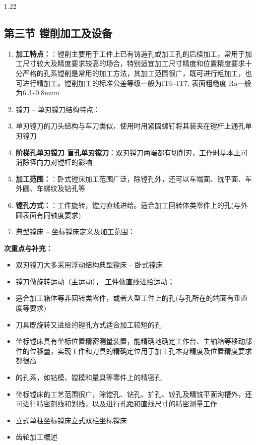 \documentclass[12pt,a4paper]{article}
\begin{document}
\begin{spacing}{1.22}
\subsection{第三节 镗削加工及设备}
\begin{tcolorbox}[colback=yellow!6,colframe=red!55!black,title=重点,left=1mm,right=1mm]
\begin{enumerate}[leftmargin=2.2em,label=\arabic*.]
  \item \textbf{加工特点：}：镗削主要用于工件上已有铸造孔或加工孔的后续加工，常用于加工尺寸较大及精度要求较高的场合，特别适宜加工尺寸精度和位置精度要求十分严格的孔系镗削是常用的加工方法，其加工范围很广，既可进行粗加工，也可进行精加工。镗削加工的标准公差等级一般为IT6\textasciitilde{}IT7, 表面粗糙度 Ra一般为6.3\textasciitilde{}0.8mum
  \item 镗刀 – 单刃镗刀结构特点：
  \item 单刃镗刀的刀头结构与车刀类似，使用时用紧固螺钉将其装夹在镗杆上通孔单刃镗刀
  \item \textbf{阶梯孔单刃镗刀 盲孔单刃镗刀}：双刃镗刀两端都有切削刃，工作时基本上可消除径向力对镗杆的影响
  \item \textbf{加工范围：}：卧式镗床加工范围广泛，除镗孔外，还可以车端面、铣平面、车外圆、车螺纹及钻孔等
  \item \textbf{镗孔方式：}：工件旋转，镗刀直线进给。适合加工回转体类零件上的孔(与外圆表面有同轴度要求)
  \item 典型镗床 – 坐标镗床定义及加工范围：
\end{enumerate}
\end{tcolorbox}
\noindent\textbf{次重点与补充：}
\begin{itemize}[leftmargin=2.2em,label=--]
  \item 双刃镗刀大多采用浮动结构典型镗床 – 卧式镗床
  \item 镗刀做旋转运动（主运动）， 工件做直线进给运动；
  \item 适合加工箱体等非回转类零件，或者大型工件上的孔(与孔所在的端面有垂直度等要求)
  \item 刀具既旋转又进给的镗孔方式适合加工较短的孔
  \item 坐标镗床具有坐标位置精密测量装置，能精确地确定工作台、主轴箱等移动部件的位移量，实现工件和刀具的精确定位用于加工孔本身精度及位置精度要求都很高
  \item 的孔系，如钻模、镗模和量具等零件上的精密孔
  \item 坐标镗床的工艺范围很广，除镗孔、钻孔、扩孔、铰孔及精铣平面沟槽外，还可进行精密刻线和划线，以及进行孔距和直线尺寸的精密测量工作
  \item 立式单柱坐标镗床立式双柱坐标镗床
  \item 齿轮加工概述
\end{itemize}


\end{spacing}
\end{document}
